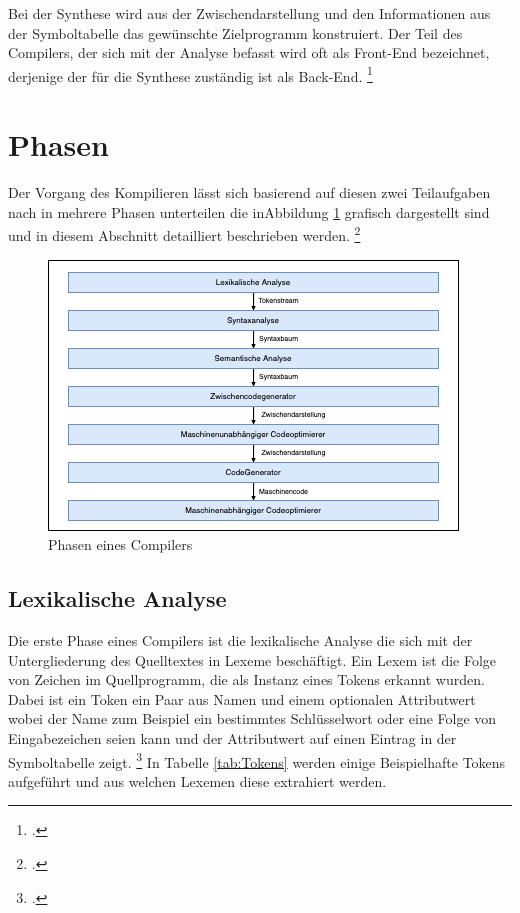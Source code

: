 Bei der Synthese wird aus der Zwischendarstellung und den Informationen aus der Symboltabelle das gewünschte Zielprogramm konstruiert. Der Teil des Compilers, der sich mit der Analyse befasst wird oft als Front-End bezeichnet, derjenige der für die Synthese zuständig ist als Back-End.  \footcite[Vgl.][S. 7]{Ullmann2008}

\section{Phasen}
Der Vorgang des Kompilieren lässt sich basierend auf diesen zwei Teilaufgaben nach \citeauthor{Ullmann2008} in mehrere Phasen unterteilen die inAbbildung \ref{fig:Compilerphasen} grafisch dargestellt sind und in diesem Abschnitt detailliert beschrieben werden.  \footcite[Vgl.][S. 6]{Ullmann2008}

\begin{figure}[!ht]
 \includegraphics{Images/Compiler/Phasen.png}
 \caption[Phasen eines Compilers]{Phasen eines Compilers\protect\footnotemark}
 \label{fig:Compilerphasen}
\end{figure}


\subsection{Lexikalische Analyse}
Die erste Phase eines Compilers ist die lexikalische Analyse die sich mit der Untergliederung des Quelltextes in Lexeme beschäftigt.  Ein Lexem ist die Folge von Zeichen im Quellprogramm,  die als Instanz eines Tokens erkannt wurden.  Dabei ist ein Token ein Paar aus Namen und einem optionalen Attributwert wobei der Name zum Beispiel ein bestimmtes Schlüsselwort oder eine Folge von Eingabezeichen seien kann und der Attributwert auf einen Eintrag in der Symboltabelle zeigt.  \footcite[Vgl.][S. 135 f.]{Ullmann2008} In Tabelle \ref{tab:Tokens} werden einige Beispielhafte Tokens aufgeführt und aus welchen Lexemen diese extrahiert werden.

